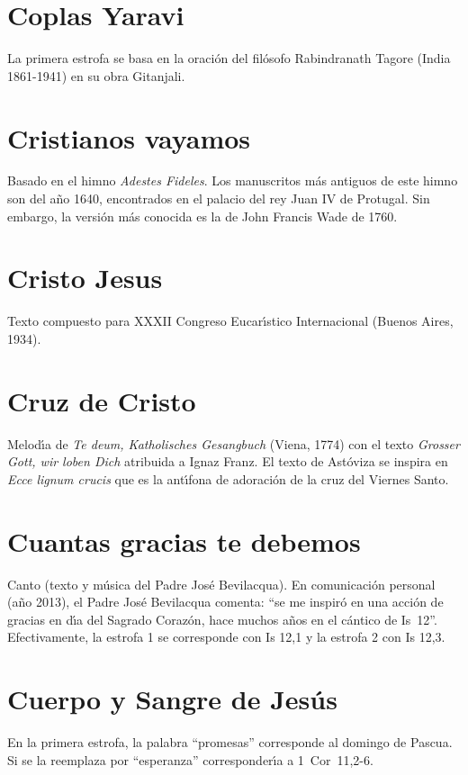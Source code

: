 \documentclass[landscape,12pt]{report}
\begin{document}
\section*{\small Coplas Yaravi} La primera estrofa se basa en la oraci\'on del fil\'osofo Rabindranath Tagore (India 1861-1941) en su obra Gitanjali.
\section*{\small Cristianos vayamos} \noindent\footnotesize Basado en el himno \textit{Adestes Fideles}. Los manuscritos m\'as antiguos de este himno son del a\~no 1640, encontrados en el palacio del rey Juan IV de Protugal. Sin embargo, la versi\'on m\'as conocida es la de John Francis Wade de 1760. 
\section*{\small Cristo Jesus} Texto compuesto para XXXII Congreso Eucar\'\i stico Internacional (Buenos Aires, 1934).
\section*{\small Cruz de Cristo} \noindent\footnotesize Melod\'\i a de \textit{Te deum, Katholisches Gesangbuch} (Viena, 1774) con el texto \textit{Grosser Gott, wir loben Dich} atribuida a Ignaz Franz. El texto de Ast\'oviza se inspira en \textit{Ecce lignum crucis} que es la ant\'\i fona de adoraci\'on de la cruz del Viernes Santo.
\section*{\small Cuantas gracias te debemos} \noindent\footnotesize Canto (texto y m\'usica del Padre Jos\'e Bevilacqua). En comunicaci\'on personal (a\~no 2013), el Padre Jos\'e Bevilacqua comenta: ``se me inspir\'o en una acci\'on de gracias en d\'\i a del Sagrado Coraz\'on, hace muchos a\~nos en el c\'antico de \mbox{Is 12}''. Efectivamente, la estrofa 1 se corresponde con Is 12,1 y la estrofa 2 con Is 12,3.
\section*{\small Cuerpo y Sangre de Jes\'us} \noindent\footnotesize En la primera estrofa, la palabra ``promesas'' corresponde al domingo de Pascua. Si se la reemplaza por ``esperanza'' corresponder\'\i a a \mbox{1 Cor 11,2-6}.
\end{document}
